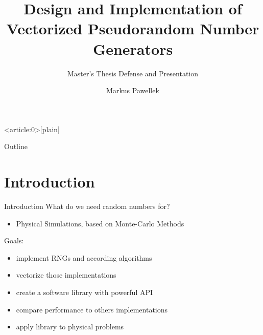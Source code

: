 \documentclass[aspectratio=169]{beamer}
\title{%
  Design and Implementation of Vectorized Pseudorandom Number Generators%
}
\subtitle{Master's Thesis Defense and Presentation}
\author{Markus Pawellek}
\begin{document}

  { %
      \begin{frame}<article:0>[plain]
       \end{frame}
  }

  \frame{\titlepage}
  \begin{frame}{Outline}
    \footnotesize
    \hfill\parbox[t][7cm][l]{0.9\textwidth}{\tableofcontents}
  \end{frame}

  \section{Introduction} %
  \label{sec:introduction}
    \begin{frame}{Introduction}
      What do we need random numbers for?
      \pause
      \begin{itemize}
        \item Physical Simulations, based on Monte-Carlo Methods
      \end{itemize}
      \bigskip
      \pause
      Goals:
      \begin{itemize}
        \pause
        \item implement RNGs and according algorithms
        \pause
        \item vectorize those implementations
        \pause
        \item create a software library with powerful API
        \pause
        \item compare performance to others implementations
        \pause
        \item apply library to physical problems
      \end{itemize}
    \end{frame}
\end{document}
